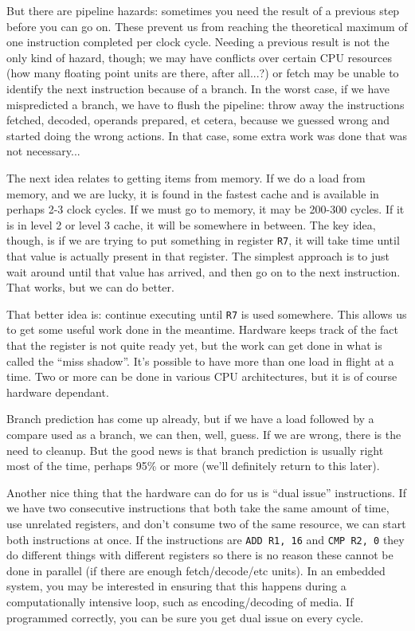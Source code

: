 But there are pipeline hazards: sometimes you need the result of a previous step before you can go on. These prevent us from reaching the theoretical maximum of one instruction completed per clock cycle. Needing a previous result is not the only kind of hazard, though; we may have conflicts over certain CPU resources (how many floating point units are there, after all...?) or fetch may be unable to identify the next instruction because of a branch. In the worst case, if we have mispredicted a branch, we have to flush the pipeline: throw away the instructions fetched, decoded, operands prepared, et cetera, because we guessed wrong and started doing the wrong actions. In that case, some extra work was done that was not necessary... 

The next idea relates to getting items from memory. If we do a load from memory, and we are lucky, it is found in the fastest cache and is available in perhaps 2-3 clock cycles. If we must go to memory, it may be 200-300 cycles. If it is in level 2 or level 3 cache, it will be somewhere in between. The key idea, though, is if we are trying to put something in register \texttt{R7}, it will take time until that value is actually present in that register. The simplest approach is to just wait around until that value has arrived, and then go on to the next instruction. That works, but we can do better.

That better idea is: continue executing until \texttt{R7} is used somewhere. This allows us to get some useful work done in the meantime. Hardware keeps track of the fact that the register is not quite ready yet, but the work can get done in what is called the ``miss shadow''. It's possible to have more than one load in flight at a time. Two or more can be done in various CPU architectures, but it is of course hardware dependant. 

Branch prediction has come up already, but if we have a load followed by a compare used as a branch, we can then, well, guess. If we are wrong, there is the need to cleanup. But the good news is that branch prediction is usually right most of the time, perhaps 95\% or more (we'll definitely return to this later).

Another nice thing that the hardware can do for us is ``dual issue'' instructions. If we have two consecutive instructions that both take the same amount of time, use unrelated registers, and don't consume two of the same resource, we can start both instructions at once. If the instructions are \texttt{ADD R1, 16} and \texttt{CMP R2, 0} they do different things with different registers so there is no reason these cannot be done in parallel (if there are enough fetch/decode/etc units). In an embedded system, you may be interested in ensuring that this happens during a computationally intensive loop, such as encoding/decoding of media. If programmed correctly, you can be sure you get dual issue on every cycle.


